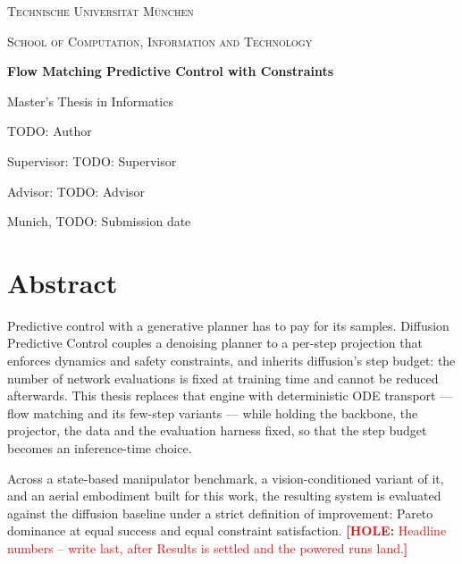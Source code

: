 \documentclass[headsepline,footsepline,footinclude=false,oneside,fontsize=11pt,paper=a4,listof=totoc,bibliography=totoc]{scrbook}
\newcommand*{\getUniversity}{Technische Universität München}
\newcommand*{\getDegree}{Informatics}
\newcommand*{\getSchool}{Computation, Information and Technology}
\newcommand*{\getTitle}{Flow Matching Predictive Control with Constraints}
\newcommand*{\getAuthor}{TODO: Author}
\newcommand*{\getDoctype}{Master's Thesis in \getDegree}
\newcommand*{\getSupervisor}{TODO: Supervisor}
\newcommand*{\getAdvisor}{TODO: Advisor}
\newcommand*{\getSubmissionDate}{TODO: Submission date}
\newcommand*{\getSubmissionLocation}{Munich}
\newcommand{\hole}[1]{\textcolor{red}{\textbf{[HOLE:} #1\textbf{]}}}
\begin{document}
\ifstandalone
  \begin{titlepage}
    \centering
    \vspace*{2cm}
    {\scshape\LARGE \getUniversity\par}
    \vspace{0.5cm}
    {\scshape\large School of \getSchool\par}
    \vspace{2.5cm}
    {\huge\bfseries \getTitle\par}
    \vspace{1cm}
    {\Large \getDoctype\par}
    \vfill
    {\large \getAuthor\par}
    \vspace{1cm}
    {\large Supervisor: \getSupervisor\par}
    {\large Advisor: \getAdvisor\par}
    \vspace{1cm}
    {\large \getSubmissionLocation, \getSubmissionDate\par}
  \end{titlepage}
  \chapter*{Abstract}
\else
  
  
  
  
\fi

\ifstandalone
Predictive control with a generative planner has to pay for its samples. Diffusion
Predictive Control couples a denoising planner to a per-step projection that enforces
dynamics and safety constraints, and inherits diffusion's step budget: the number of
network evaluations is fixed at training time and cannot be reduced afterwards. This
thesis replaces that engine with deterministic ODE transport --- flow matching and its
few-step variants --- while holding the backbone, the projector, the data and the
evaluation harness fixed, so that the step budget becomes an inference-time choice.

Across a state-based manipulator benchmark, a vision-conditioned variant of it, and an
aerial embodiment built for this work, the resulting system is evaluated against the
diffusion baseline under a strict definition of improvement: Pareto dominance at equal
success and equal constraint satisfaction. \hole{Headline numbers -- write last, after
Results is settled and the powered runs land.}
\end{document}
